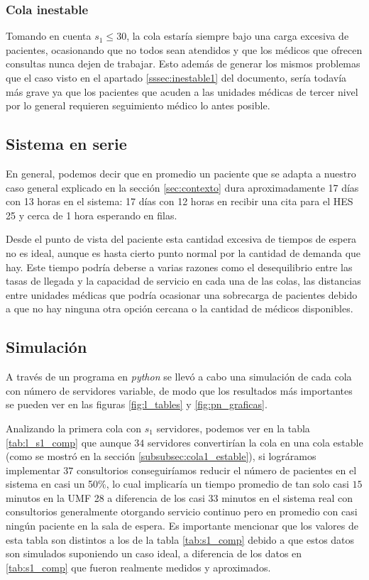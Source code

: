 \documentclass[10pt]{article}
\begin{document}
    \subsubsection{Cola inestable}
    Tomando en cuenta $s_{1} \leq 30$, la cola estaría siempre bajo una carga excesiva de pacientes, ocasionando que no todos sean atendidos y que los médicos que ofrecen consultas nunca dejen de trabajar. Esto además de generar los mismos problemas que el caso visto en el apartado \ref{sssec:inestable1} del documento, sería todavía más grave ya que los pacientes que acuden a las unidades médicas de tercer nivel por lo general requieren seguimiento médico lo antes posible.
    
    \newpage
    
    \subsection{Sistema en serie}
    En general, podemos decir que en promedio un paciente que se adapta a nuestro caso general explicado en la sección \ref{sec:contexto} dura aproximadamente 17 días con 13 horas en el sistema: 17 días con 12 horas en recibir una cita para el HES 25 y cerca de 1 hora esperando en filas.
    
    Desde el punto de vista del paciente esta cantidad excesiva de tiempos de espera no es ideal, aunque es hasta cierto punto normal por la cantidad de demanda que hay. Este tiempo podría deberse a varias razones como el desequilibrio entre las tasas de llegada y la capacidad de servicio en cada una de las colas, las distancias entre unidades médicas que podría ocasionar una sobrecarga de pacientes debido a que no hay ninguna otra opción cercana o la cantidad de médicos disponibles.
    
    \subsection{Simulación}
    A través de un programa en \textit{python} se llevó a cabo una simulación de cada cola con número de servidores variable, de modo que los resultados más importantes se pueden ver en las figuras \ref{fig:l_tables} y \ref{fig:pn_graficas}.
    
    Analizando la primera cola con $s_{1}$ servidores, podemos ver en la tabla \ref{tab:l_s1_comp} que aunque $34$ servidores convertirían la cola en una cola estable (como se mostró en la sección \ref{subsubsec:cola1_estable}), si lográramos implementar $37$ consultorios conseguiríamos reducir el número de pacientes en el sistema en casi un 50\%, lo cual implicaría un tiempo promedio de tan solo casi $15$ minutos en la UMF 28 a diferencia de los casi $33$ minutos en el sistema real con consultorios generalmente otorgando servicio continuo pero en promedio con casi ningún paciente en la sala de espera. Es importante mencionar que los valores de esta tabla son distintos a los de la tabla \ref{tab:s1_comp} debido a que estos datos son simulados suponiendo un caso ideal, a diferencia de los datos en \ref{tab:s1_comp} que fueron realmente medidos y aproximados.
    
\end{document}
